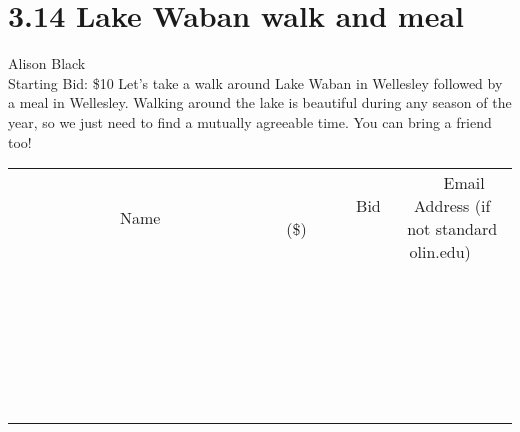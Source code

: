\documentclass[11pt]{article}
\begin{document}
\section*{3.14 Lake Waban walk and meal}
Alison Black
\\
Starting Bid: \$10
\newline
Let's take a walk around Lake Waban in Wellesley followed by a meal in Wellesley.  Walking around the lake is beautiful during any season of the year, so we just need to find a mutually agreeable time.  You can bring a friend too!
\\[6ex]
\begin{tabular}{c c c}
~~~~~~~~~~~~~Name~~~~~~~~~~~~~ & ~~~~~~~~~Bid (\$)~~~~~~~~~  & ~~~Email Address (if not standard olin.edu)~~~\\
 & & \\
\hline
 & & \\
\hline
 & & \\
\hline
 & & \\
\hline
 & & \\
\hline
 & & \\
\hline
 & & \\
\hline
 & & \\
\hline
 & & \\
\hline
 & & \\
\hline
 & & \\
\hline
 & & \\
\hline
 & & \\
\hline
 & & \\
\hline
 & & \\
\hline
 & & \\
\hline
 & & \\
\hline
 & & \\
\hline
 & & \\
\hline
 & & \\
\hline
 & & \\
\hline
 & & \\
\hline
 & & \\
\hline
 & & \\
\hline
 & & \\
\hline
 & & \\
\hline
\end{tabular}
\newpage
\end{document}
